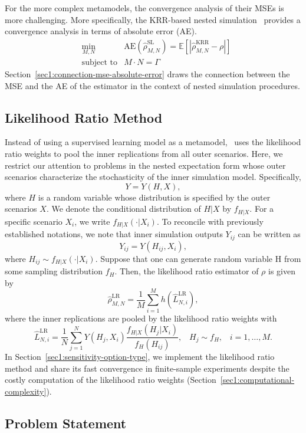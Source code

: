 For the more complex metamodels, the convergence analysis of their MSEs is more challenging.
More specifically, the KRR-based nested simulation~\citep{wang2022smooth} provides a convergence analysis in terms of absolute error (AE).
\begin{align} \label{eq1:ae}
    & \min_{M, N}  & \text{AE}(\hat{\rho}^{\text{SL}}_{M, N}) = \mathbb{E} \left[ \left| \hat{\rho}^{\text{KRR}}_{M, N} - \rho \right| \right] \nonumber \\
    & \text{subject to} & M \cdot N = \Gamma 
\end{align}
Section~\ref{sec1:connection-mse-absolute-error} draws the connection between the MSE and the AE of the estimator in the context of nested simulation procedures.

\subsection{Likelihood Ratio Method}

Instead of using a supervised learning model as a metamodel,~\cite{zhang2022sample} uses the likelihood ratio weights to pool the inner replications from all outer scenarios.
Here, we restrict our attention to problems in the nested expectation form whose outer scenarios characterize the stochasticity of the inner simulation model. 
Specifically,
$$ Y = Y(H, X), $$
where $H$ is a random variable whose distribution is specified by the outer scenarios $X$. 
We denote the conditional distribution of $H|X$ by $f_{H|X}$. 
For a specific scenario $X_i$, we write $f_{H|X}(\cdot |X_i)$. 
To reconcile with previously established notations, we note that inner simulation outputs $Y_{ij}$ can be written as
$$ Y_{ij} = Y(H_{ij}, X_i), $$
where $H_{ij} \sim f_{H|X}(\cdot |X_i)$.
Suppose that one can generate random variable H from some sampling
distribution $f_H$. Then, the likelihood ratio estimator of $\rho$ is given by
$$\hat{\rho}^{\text{LR}}_{M,N} = \frac{1}{M} \sum_{i=1}^M h(\hat{L}^{\text{LR}}_{N, i}), $$ where the inner replications are pooled by the likelihood ratio weights with
$$\hat{L}^{\text{LR}}_{N, i} = \frac{1}{N} \sum_{j=1}^N Y(H_j, X_i) \frac{f_{H|X}(H_{j}|X_i)}{f_H(H_{ij})}, \;\;\; H_j \sim f_H, \;\;\; i=1, \dots, M.$$
In Section~\ref{sec1:sensitivity-option-type}, we implement the likelihood ratio method and share its fast convergence in finite-sample experiments despite the costly computation of the likelihood ratio weights (Section~\ref{sec1:computational-complexity}).

\subsection{Problem Statement}

